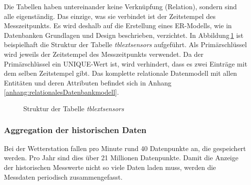 \noindent
Die Tabellen haben untereinander keine Verknüpfung (Relation), sondern sind alle eigenständig. Das einzige, was sie verbindet ist der Zeitstempel des Messzeitpunkts. Es wird deshalb auf die Erstellung eines ER-Modells, wie in Datenbanken Grundlagen und Design \cite{FrankGeisler2011mitpu} beschrieben, verzichtet. In Abbildung\,\ref{img:tabellenstruktur} ist beispielhaft die Struktur der Tabelle \emph{tblextsensors} aufgeführt. Als Primärschlüssel wird jeweils der Zeitstempel des Messzeitpunkts verwendet. Da der Primärschlüssel ein UNIQUE-Wert ist, wird verhindert, dass es zwei Einträge mit dem selben Zeitstempel gibt. Das komplette relationale Datenmodell mit allen Entitäten und deren Attributen befindet sich in Anhang\,\ref{anhang:relationalesDatenbankmodell}.

\begin{figure}[htbp!]
	\centering
	\caption{Struktur der Tabelle \emph{tblextsensors}}
	\label{img:tabellenstruktur}
\end{figure}



\subsubsection{Aggregation der historischen Daten}
Bei der Wetterstation fallen pro Minute rund 40 Datenpunkte an, die gespeichert werden. Pro Jahr sind dies über 21 Millionen Datenpunkte. Damit die Anzeige der historischen Messwerte nicht so viele Daten laden muss, werden die Messdaten periodisch zusammengefasst.
\newline

